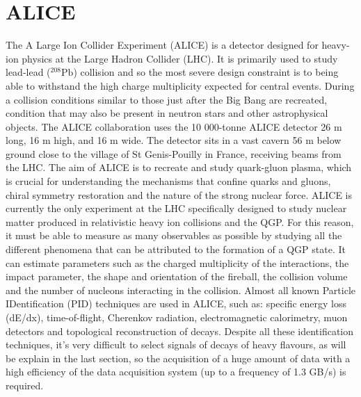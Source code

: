 \documentclass[12pt,a4paper]{book}
\begin{document}
	
	
	\FloatBarrier
	
	\chapter{ALICE}
	
	The A Large Ion Collider Experiment (ALICE) is a detector designed for heavy-ion physics at the Large Hadron Collider (LHC). It is primarily used to study lead-lead ($^{208}\text{Pb}$) collision and so the most severe design constraint is to being able to withstand the high charge multiplicity expected for central events. During a collision conditions similar to those just after the Big Bang are recreated, condition that may also be present in neutron stars and other astrophysical objects. The ALICE collaboration uses the 10 000-tonne ALICE detector 26 m long, 16 m high, and 16 m wide. The detector sits in a vast cavern 56 m below ground close to the village of St Genis-Pouilly in France, receiving beams from the LHC. \cite{Alice}  The aim of ALICE is to recreate and study quark-gluon plasma, which is crucial for understanding the mechanisms that confine quarks and gluons, chiral symmetry restoration and the nature of the strong nuclear force. ALICE is currently the only experiment at the LHC specifically designed to study nuclear matter produced in relativistic heavy ion collisions and the QGP. For this reason, it must be able to measure as many observables as possible by studying all the different phenomena that can be attributed to the formation of a QGP state. It can estimate parameters such as the charged multiplicity of the interactions, the impact parameter, the shape and orientation of the fireball, the collision volume and the number of nucleons interacting in the collision. Almost all known Particle IDentification (PID) techniques are used in ALICE, such as: specific energy loss (dE/dx), time-of-flight, Cherenkov radiation, electromagnetic calorimetry, muon detectors and topological reconstruction of decays. 
	Despite all these identification techniques, it's very difficult to select signals of decays of heavy flavours, as will be explain in the last section, so the acquisition of a huge amount of data with a high efficiency of the data acquisition system (up to a frequency of 1.3 GB/s) is required. 
	
\end{document}
